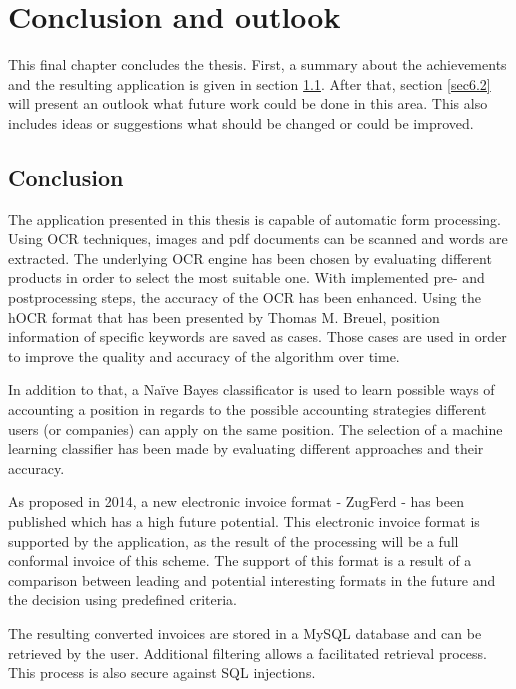 %
% 
\chapter{Conclusion and outlook}
\label{cha6}

This final chapter concludes the thesis. First, a summary about the achievements and the resulting application is given in section \ref{sec6.1}. After that, section \ref{sec6.2} will present an outlook what future work could be done in this area. This also includes ideas or suggestions what should be changed or could be improved.

\section{Conclusion}
\label{sec6.1}

The application presented in this thesis is capable of automatic form processing. Using OCR techniques, images and pdf documents can be scanned and words are extracted. The underlying OCR engine has been chosen by evaluating different products in order to select the most suitable one.
With implemented pre- and postprocessing steps, the accuracy of the OCR has been enhanced. Using the hOCR format that has been presented by Thomas M. Breuel\cite{Breuel07}, position information of specific keywords are saved as cases. Those cases are used in order to improve the quality and accuracy of the algorithm over time. 

In addition to that, a Na{\"i}ve Bayes classificator is used to learn possible ways of accounting a position in regards to the possible accounting strategies different users (or companies) can apply on the same position. The selection of a machine learning classifier has been made by evaluating different approaches and their accuracy. 

As proposed in 2014, a new electronic invoice format - ZugFerd - has been published which has a high future potential\cite{Ferd14}. This electronic invoice format is supported by the application, as the result of the processing will be a full conformal invoice of this scheme. The support of this format is a result of a comparison between leading and potential interesting formats in the future and the decision using predefined criteria.

The resulting converted invoices are stored in a MySQL database and can be retrieved by the user. Additional filtering allows a facilitated retrieval process. This process is also secure against SQL injections.

